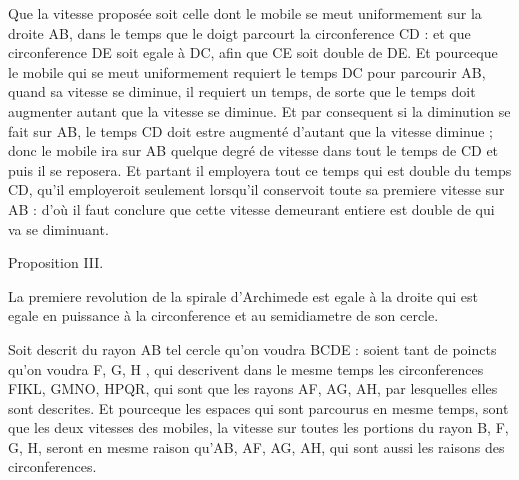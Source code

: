 \documentclass[11pt,a4paper]{article}
\begin{document}
Que la vitesse proposée soit celle dont le mobile se meut uniformement sur la droite AB, dans le temps que le doigt  parcourt la circonference CD : et que   circonference DE soit egale à DC, afin que CE soit double de DE. Et pourceque le mobile qui se meut uniformement requiert le temps DC pour parcourir AB, quand sa vitesse se diminue, il requiert un  temps, de sorte que  le temps doit augmenter autant que la vitesse se diminue. Et par consequent si la  \struck{\ill{}} diminution se fait sur AB, le temps CD doit estre augmenté d'autant que la vitesse diminue ; donc le mobile \struck{\ill{}} ira sur AB \struck{\ill{}}  quelque degré de vitesse dans tout le temps de CD et puis il se reposera. Et partant il employera tout ce temps qui est double du temps CD, qu'il employeroit seulement lorsqu'il conservoit toute sa premiere vitesse sur AB : d'où il faut conclure que cette vitesse demeurant entiere est double de  qui va se diminuant.

Proposition III.

 La premiere revolution de la spirale d'Archimede est egale à la  droite qui est egale en puissance à la circonference et au semidiametre de son cercle.

Soit descrit du rayon AB tel cercle qu'on voudra BCDE :  soient tant de poincts qu'on voudra F, G, H , qui descrivent dans le mesme temps les circonferences FIKL, GMNO, HPQR, qui sont  que les rayons AF, AG, AH, par lesquelles elles sont descrites. Et pourceque les espaces qui sont parcourus en mesme temps, sont  que les deux vitesses des mobiles, la vitesse \add{\ill{}} \struck{\ill{}} sur toutes les portions du rayon B, F, G, H, seront en mesme raison qu'AB, AF, AG, AH, qui sont aussi les raisons des circonferences.
\end{document}
